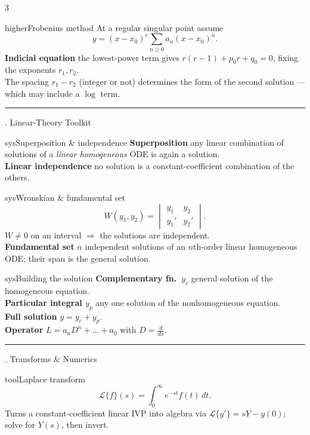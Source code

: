 \documentclass[10pt]{article}
\newcommand{\lab}[1]{\textcolor{ink}{\sffamily\footnotesize\textbf{#1}}\;}
\newcommand{\sect}[2]{%
  \begin{tcolorbox}[blanker, breakable, before skip=2pt, after skip=2pt]
    \begingroup\sffamily\bfseries\normalsize\color{#1}%
    {\color{#1}\rule[-1pt]{3pt}{12pt}}\;#2\endgroup
    \par\vspace{1pt}{\color{#1}\hrule height 1pt}
\end{tcolorbox}}
\begin{document}
\begin{multicols}{3}
  \begin{card}{higher}{Frobenius method}
    At a regular singular point assume
    \[ y=(x-x_{0})^{r}\sum_{n\ge 0} a_{n} (x-x_{0})^{n} . \]
    \lab{Indicial equation} the lowest-power term gives \(r(r-1)+p_{0} r+q_{0}=0\), fixing the exponents \(r_{1},r_{2}\).\\
    The spacing \(r_{1}-r_{2}\) (integer or not) determines the form of the second solution --- which may include a \(\log\) term.
  \end{card}

  \sect{sys}{8.\; Linear-Theory Toolkit}

  \begin{card}{sys}{Superposition \& independence}
    \lab{Superposition} any linear combination of solutions of a \emph{linear homogeneous} ODE is again a solution.\\
    \lab{Linear independence} no solution is a constant-coefficient combination of the others.
  \end{card}

  \begin{card}{sys}{Wronskian \& fundamental set}
    \[
      W(y_{1},y_{2})=
      \begin{vmatrix} y_{1} & y_{2}\\ y_{1}' & y_{2}'
      \end{vmatrix}.
    \]
    \(W\neq 0\) on an interval \(\Rightarrow\) the solutions are independent.\\
    \lab{Fundamental set} \(n\) independent solutions of an \(n\)th-order linear homogeneous ODE; their span is the general solution.
  \end{card}

  \begin{card}{sys}{Building the solution}
    \lab{Complementary fn.\ \(y_{c}\)} general solution of the homogeneous equation.\\
    \lab{Particular integral \(y_{p}\)} any one solution of the nonhomogeneous equation.\\
    \lab{Full solution} \(y=y_{c}+y_{p}\).\\
    \lab{Operator} \(L=a_{n}D^{n}+\dots+a_{0}\) with \(D=\tfrac{d}{dx}\).
  \end{card}

  \sect{tool}{9.\; Transforms \& Numerics}

  \begin{card}{tool}{Laplace transform}
    \[ \mathcal{L}\{f\}(s)=\int_{0}^{\infty} e^{-st} f(t)\,dt . \]
    Turns a constant-coefficient linear IVP into algebra via \(\mathcal{L}\{y'\}=sY-y(0)\); solve for \(Y(s)\), then invert.
  \end{card}


\end{multicols}
\end{document}
